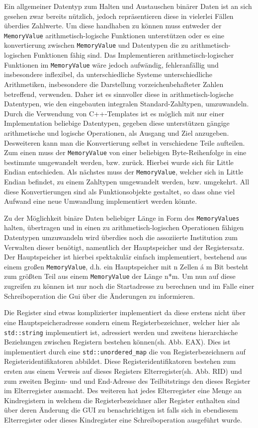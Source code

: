 Ein allgemeiner Datentyp zum Halten und Austauschen binärer Daten ist an sich gesehen zwar bereits nützlich, jedoch repräsentieren diese in vielerlei Fällen überdies Zahlwerte. Um diese handhaben zu können muss entweder der \texttt{MemoryValue} arithmetisch-logische Funktionen unterstützen oder es eine konvertierung zwischen \texttt{MemoryValue} und Datentypen die zu arithmetisch-logischen Funktionen fähig sind. Das Implementieren arithmetisch-logischer Funktionen im \texttt{MemoryValue} wäre jedoch aufwändig, fehleranfällig und insbesondere inflexibel, da unterschiedliche Systeme unterschiedliche Arithmetiken, insbesondere die Darstellung vorzeichenbehafteter Zahlen betreffend, verwenden. Daher ist es sinnvoller diese in arithmetisch-logische Datentypen, wie den eingebauten integralen Standard-Zahltypen, umzuwandeln. Durch die Verwendung von C++-Templates ist es möglich mit nur einer Implementation beliebige Datentypen, gegeben diese unterstützen gängige arithmetische und logische Operationen, als Ausgang und Ziel anzugeben. Desweiteren kann man die Konvertierung selbst in verschiedene Teile aufteilen. Zum einen muss der \texttt{MemoryValue} von einer beliebigen Byte-Reihenfolge in eine bestimmte umgewandelt werden, bzw. zurück. Hierbei wurde sich für Little Endian entschieden. Als nächstes muss der \texttt{MemoryValue}, welcher sich in Little Endian befindet, zu einem Zahltypen umgewandelt werden, bzw. umgekehrt. All diese Konvertierungen sind als Funktionsobjekte gestaltet, so dass ohne viel Aufwand eine neue Umwandlung implementiert werden könnte.

Zu der Möglichkeit binäre Daten beliebiger Länge in Form des \texttt{MemoryValues} halten, übertragen und in einen zu arithmetisch-logischen Operationen fähigen Datentypen umzuwandeln wird überdies noch die assoziierte Institution zum Verwalten dieser benötigt, namentlich der Hauptspeicher und der Registersatz.
Der Hauptspeicher ist hierbei spektakulär einfach implementiert, bestehend aus einem großen \texttt{MemoryValue}, d.h. ein Hauptspeicher mit n Zellen á m Bit besteht zum größten Teil aus einem \texttt{MemoryValue} der Länge n*m. Um nun auf diese zugreifen zu können ist nur noch die Startadresse zu berechnen und im Falle einer Schreiboperation die Gui über die Änderungen zu informieren.

Die Register sind etwas komplizierter implementiert da diese erstens nicht über eine Hauptspeicheradresse sondern einem Registerbezeichner, welcher hier als \texttt{std::string} implementiert ist, adressiert werden und zweitens hierarchische Beziehungen zwischen Registern bestehen können(sh. Abb. EAX). Dies ist implementiert durch eine \texttt{std::unordered\_map} die von  Registerbezeichnern auf Registeridentifikatoren abbildet. Diese Registeridentifikatoren bestehen zum ersten aus einem Verweis auf dieses Registers Elterregister(sh. Abb. RID) und zum zweiten Beginn- und und End-Adresse des Teilbitstrings den dieses Register im Elterregister ausmacht. Des weiteren hat jedes Elterregister eine Menge an Kindregistern in welchem die Registerbezeichner aller Register enthalten sind über deren Änderung die GUI zu benachrichtigen ist falls sich in ebendiesem Elterregister oder dieses Kindregister eine Schreiboperation ausgeführt wurde.


